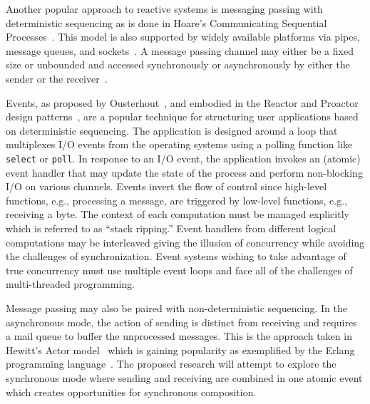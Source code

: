 Another popular approach to reactive systems is messaging passing with deterministic sequencing as is done in Hoare's Communicating Sequential Processes~\cite{hoare1978communicating}.
This model is also supported by widely available platforms via pipes, message queues, and sockets~\cite{silberschatz2005operating}.
A message passing channel may either be a fixed size or unbounded and accessed synchronously or asynchronously by either the sender or the receiver~\cite{andrews1983concepts}.

Events, as proposed by Ousterhout~\cite{ousterhout1996threads}, and embodied in the Reactor and Proactor design patterns~\cite{schmidt2000pattern}, are a popular technique for structuring user applications based on deterministic sequencing.
The application is designed around a loop that multiplexes I/O events from the operating systems using a polling function like \verb+select+ or \verb+poll+.
In response to an I/O event, the application invokes an (atomic) event handler that may update the state of the process and perform non-blocking I/O on various channels.
Events invert the flow of control since high-level functions, e.g., processing a message, are triggered by low-level functions, e.g., receiving a byte.
The context of each computation must be managed explicitly which is referred to as ``stack ripping\cite{adya2002cooperative}.''
Event handlers from different logical computations may be interleaved giving the illusion of concurrency while avoiding the challenges of synchronization.
Event systems wishing to take advantage of true concurrency must use multiple event loops and face all of the challenges of multi-threaded programming.

Message passing may also be paired with non-deterministic sequencing.
In the asynchronous mode, the action of sending is distinct from receiving and requires a mail queue to buffer the unprocessed messages.
This is the approach taken in Hewitt's Actor model~\cite{hewitt1973universal} which is gaining popularity as exemplified by the Erlang programming language~\cite{armstrong1996concurrent}.
The proposed research will attempt to explore the synchronous mode where sending and receiving are combined in one atomic event which creates opportunities for synchronous composition.

